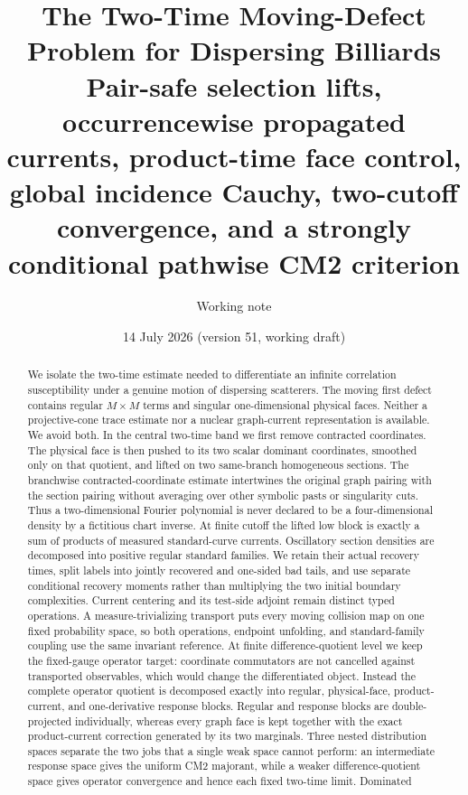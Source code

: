 \documentclass[11pt]{article}
\title{The Two-Time Moving-Defect Problem for Dispersing Billiards\\
\large Pair-safe selection lifts, occurrencewise propagated currents,
product-time face control,
global incidence Cauchy,
two-cutoff convergence, and a strongly conditional
pathwise CM2 criterion}
\author{Working note}
\date{14 July 2026 (version 51, working draft)}
\begin{document}
\maketitle

\begin{abstract}\sloppy
We isolate the two-time estimate needed to differentiate an infinite
correlation susceptibility under a genuine motion of dispersing scatterers.
The moving first defect contains regular $M\times M$ terms and singular
one-dimensional physical faces.  Neither a projective-cone trace estimate nor
a nuclear graph-current representation is available.  We avoid both.  In the
central two-time band we first remove contracted coordinates.  The physical
face is then pushed to its two scalar dominant coordinates, smoothed only on
that quotient, and lifted on two same-branch homogeneous sections.  The
branchwise contracted-coordinate estimate intertwines the original graph
pairing with the section pairing without averaging over other symbolic pasts
or singularity cuts.  Thus a two-dimensional Fourier polynomial is never
declared to be a four-dimensional density by a fictitious chart inverse.  At
finite cutoff the lifted low block is exactly a sum of products of measured
standard-curve currents.  Oscillatory section densities are decomposed into
positive regular standard families.  We retain their actual recovery times,
split labels into jointly recovered and one-sided bad tails, and use separate
conditional recovery moments rather than multiplying the two initial boundary
complexities.  Current centering and its test-side adjoint remain
distinct typed operations.  A measure-trivializing transport puts every
moving collision map on one fixed probability space, so both operations,
endpoint unfolding, and standard-family coupling use the same invariant
reference.  At finite difference-quotient level we keep the fixed-gauge
operator target: coordinate commutators are not cancelled against transported
observables, which would change the differentiated object.  Instead the
complete operator quotient is decomposed exactly into regular, physical-face,
product-current, and one-derivative response blocks.  Regular and response
blocks are double-projected individually, whereas every graph face is kept
together with the exact product-current correction generated by its two
marginals.  Three nested distribution spaces separate the two
jobs that a single weak space cannot perform: an intermediate response space
gives the uniform CM2 majorant, while a weaker difference-quotient space gives
operator convergence and hence each fixed two-time limit.  Dominated

\end{abstract}
\end{document}
